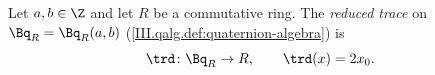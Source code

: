 Let $a,b\in\Z$ and let $R$ be a commutative ring. The \emph{reduced trace} on $\Bq_R=\Bq_R(a,b)$ (\cref{III.qalg.def:quaternion-algebra}) is
\[
  \trd\colon\Bq_R\to R,\qquad \trd(x)=2x_0.
\]
